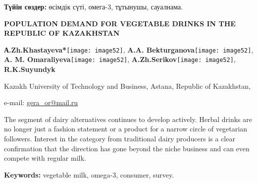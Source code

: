 {\bfseries Түйін сөздер:} өсімдік сүті, омега-3, тұтынушы, сауалнама.

\begin{center}
{\large\bfseries POPULATION DEMAND FOR VEGETABLE DRINKS IN THE REPUBLIC OF
KAZAKHSTAN}

{\bfseries А.Zh.Khastayeva*}\texttt{[image: image52]},
{\bfseries A.A. Bekturganova}\texttt{[image: image52]},
{\bfseries A. M. Omaraliyeva}\texttt{[image: image52]},
{\bfseries A.Zh.Serikov}\texttt{[image: image52]},
{\bfseries R.K.Suyundyk}

Kazakh University of Technology and Business, Astana, Republic of
Kazakhstan,

e-mail: \href{mailto:gera_or@mail.ru}{\ul{gera\_or@mail.ru}}
\end{center}

The segment of dairy alternatives continues to develop actively. Herbal
drinks are no longer just a fashion statement or a product for a narrow
circle of vegetarian followers. Interest in the category from
traditional dairy producers is a clear confirmation that the direction
has gone beyond the niche business and can even compete with regular
milk.

{\bfseries Keywords:} vegetable milk, omega-3, consumer, survey.

